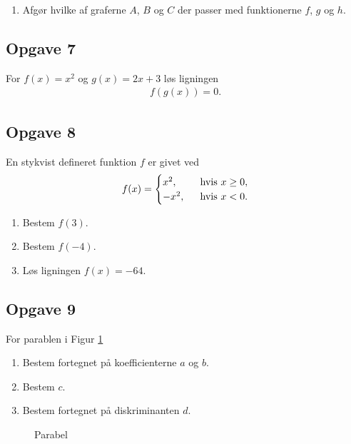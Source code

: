 \documentclass[12pt]{article}
\begin{document}
\begin{enumerate}[label=\roman*)]
	\item Afgør hvilke af graferne $A$, $B$ og $C$ der passer med funktionerne $f$, $g$ og $h$.
\end{enumerate}

\subsection*{Opgave 7}

For $f(x) = x^2$ og $g(x)=2x+3$ løs ligningen
\begin{align*}
f(g(x)) = 0.
\end{align*}

\subsection*{Opgave 8}

En stykvist defineret funktion $f$ er givet ved
\begin{align*}
	f(x) = 
	\begin{cases}
		x^2, \ &\textnormal{ hvis } x \geq 0,\\
		-x^2, \ &\textnormal{ hvis } x < 0.
	\end{cases}
\end{align*}
\begin{enumerate}[label=\roman*)]
	\item Bestem $f(3).$
	\item Bestem $f(-4).$
	\item Løs ligningen $f(x) = -64$.
\end{enumerate}

\subsection*{Opgave 9}
For parablen i Figur \ref{fig:andenpolys}
\begin{enumerate}[label=\roman*)]
\item Bestem fortegnet på koefficienterne $a$ og $b$. 
\item Bestem $c$.
\item Bestem fortegnet på diskriminanten $d$.
\end{enumerate}
\begin{figure}[H]
\centering



\caption{Parabel}
\label{fig:andenpolys}
\end{figure}
\end{document}
